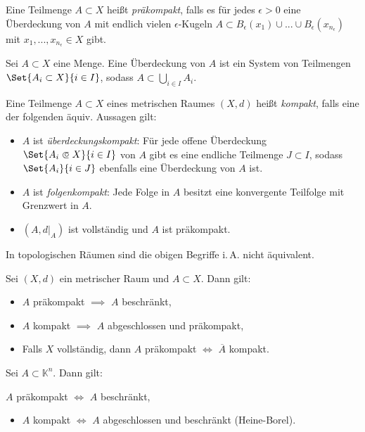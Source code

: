 \documentclass{cheat-sheet}
\newcommand{\K}{\mathbb{K}}
\begin{document}

\begin{defn}
  Eine Teilmenge $A \subset X$ heißt \emph{präkompakt}, falls es für jedes $\epsilon > 0$ eine Überdeckung von $A$ mit endlich vielen $\epsilon$-Kugeln $A \subset B_{\epsilon}(x_1) \cup ... \cup B_{\epsilon}(x_{n_\epsilon})$ mit $x_1, ..., x_{n_\epsilon} \in X$ gibt.
\end{defn}

\begin{defn}
  Sei $A \subset X$ eine Menge. Eine Überdeckung von $A$ ist ein System von Teilmengen $\Set{ A_i \subset X }{ i \in I }$, sodass $A \subset \bigcup_{i \in I} A_i$.
\end{defn}

\begin{defn}
  Eine Teilmenge $A \subset X$ eines metrischen Raumes $(X, d)$ heißt \emph{kompakt}, falls eine der folgenden äquiv. Aussagen gilt:
  \begin{itemize}
    \item $A$ ist \emph{überdeckungskompakt}: Für jede offene Überdeckung $\Set{A_i \opn X}{i \in I}$ von $A$ gibt es eine endliche Teilmenge $J \subset I$, sodass $\Set{A_i}{i \in J}$ ebenfalls eine Überdeckung von $A$ ist.
    \item $A$ ist \emph{folgenkompakt}: Jede Folge in $A$ besitzt eine konvergente Teilfolge mit Grenzwert in $A$.
    \item $(A, d|_A)$ ist vollständig und $A$ ist präkompakt.
  \end{itemize}
\end{defn}

\begin{acht}
  In topologischen Räumen sind die obigen Begriffe i.\,A. nicht äquivalent.
\end{acht}

\begin{satz}
  Sei $(X, d)$ ein metrischer Raum und $A \subset X$. Dann gilt:
  \begin{itemize}
    \item $A$ präkompakt $\implies$ $A$ beschränkt,
    \item $A$ kompakt $\implies$ $A$ abgeschlossen und präkompakt,
    \item Falls $X$ vollständig, dann $A$ präkompakt $\iff$ $\overline{A}$ kompakt.
  \end{itemize}
\end{satz}

\begin{satz}
  Sei $A \subset \K^n$. Dann gilt: \enspace
  \begin{inparaitem}
    \item $A$ präkompakt $\iff$ $A$ beschränkt,
  \end{inparaitem}
  \begin{itemize}
    \item $A$ kompakt $\iff$ $A$ abgeschlossen und beschränkt (Heine-Borel).
  \end{itemize}
\end{satz}
\end{document}
